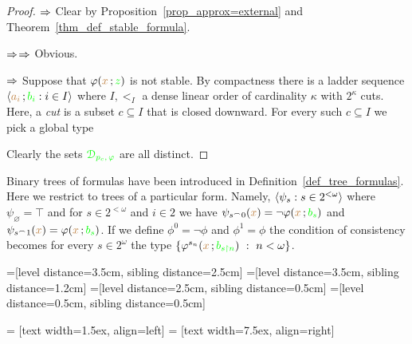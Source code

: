  \begin{proof}
 $\Rightarrow$ Clear by Proposition~\ref{prop_approx=external} and Theorem~\ref{thm_def_stable_formula}.
 
 $\Rightarrow$$\Rightarrow$ Obvious.
 
 $\Rightarrow$ Suppose that $\varphi({\color{brown} x}\,;{\color{green} z})$ is not stable.
 By compactness there is a ladder sequence  $\langle{\color{brown}a_i}\,;{\color{green} b_i} : i\in I\rangle$ where $I,<_I$ a dense linear order of cardinality $\kappa$ with $2^\kappa$ cuts.
 Here, a \textit{cut\/} is a subset $c\subseteq I$ that is closed downward.
 For every such $c\subseteq I$ we pick a global type
 
 
 Clearly the sets ${\color{green}\EuScript D_{p_c,\,\varphi} }$ are all distinct.
 \end{proof}


Binary trees of formulas have been introduced in Definition~\ref{def_tree_formulas}.
Here we restrict to trees of a particular form.
Namely, $\langle\psi_s:s\in 2^{<\omega}\rangle$  where $\psi_\varnothing=\top$ and for $s\in 2^{<\omega}$ and $i\in 2$ we have $\psi_{s^\frown 0}({\color{brown} x})=\neg\varphi({\color{brown} x}\,;{\color{green} b_s})$ and $\psi_{s^\frown 1}({\color{brown} x})=\varphi({\color{brown} x}\,;{\color{green} b_s})$.
If we define $\phi^0=\neg\phi$ and $\phi^1=\phi$ the condition of consistency becomes for every $s\in 2^\omega$ the type $\{\varphi^{s_n}({\color{brown} x}\,;{\color{green} b_{s\restriction n}})\ :\ n<\omega\}$.


=[level distance=3.5cm, sibling distance=2.5cm]
=[level distance=3.5cm, sibling distance=1.2cm]
=[level distance=2.5cm, sibling distance=0.5cm]
=[level distance=0.5cm, sibling distance=0.5cm]

 = [text width=1.5ex, align=left]
 = [text width=7.5ex, align=right]

\def\leaf{...}

